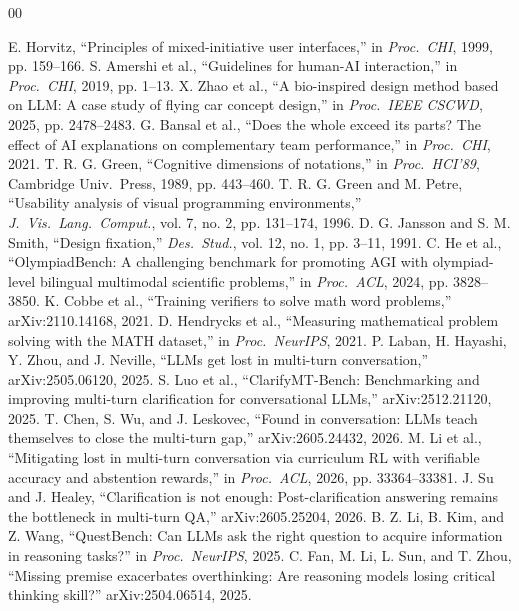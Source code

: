 \documentclass[conference,letterpaper,10pt]{IEEEtran}
\begin{document}
{\scriptsize{}\begin{thebibliography}{00}

 E. Horvitz, ``Principles of mixed-initiative user interfaces,'' in \textit{Proc.\ CHI}, 1999, pp. 159--166.
 S. Amershi et al., ``Guidelines for human-AI interaction,'' in \textit{Proc.\ CHI}, 2019, pp. 1--13.
 X. Zhao et al., ``A bio-inspired design method based on LLM: A case study of flying car concept design,'' in \textit{Proc.\ IEEE CSCWD}, 2025, pp. 2478--2483.
 G. Bansal et al., ``Does the whole exceed its parts? The effect of AI explanations on complementary team performance,'' in \textit{Proc.\ CHI}, 2021.
 T. R. G. Green, ``Cognitive dimensions of notations,'' in \textit{Proc.\ HCI'89}, Cambridge Univ.\ Press, 1989, pp. 443--460.
 T. R. G. Green and M. Petre, ``Usability analysis of visual programming environments,'' \textit{J.\ Vis.\ Lang.\ Comput.}, vol. 7, no. 2, pp. 131--174, 1996.
 D. G. Jansson and S. M. Smith, ``Design fixation,'' \textit{Des.\ Stud.}, vol. 12, no. 1, pp. 3--11, 1991.
 C. He et al., ``OlympiadBench: A challenging benchmark for promoting AGI with olympiad-level bilingual multimodal scientific problems,'' in \textit{Proc.\ ACL}, 2024, pp. 3828--3850.
 K. Cobbe et al., ``Training verifiers to solve math word problems,'' arXiv:2110.14168, 2021.
 D. Hendrycks et al., ``Measuring mathematical problem solving with the MATH dataset,'' in \textit{Proc.\ NeurIPS}, 2021.
 P. Laban, H. Hayashi, Y. Zhou, and J. Neville, ``LLMs get lost in multi-turn conversation,'' arXiv:2505.06120, 2025.
 S. Luo et al., ``ClarifyMT-Bench: Benchmarking and improving multi-turn clarification for conversational LLMs,'' arXiv:2512.21120, 2025.
 T. Chen, S. Wu, and J. Leskovec, ``Found in conversation: LLMs teach themselves to close the multi-turn gap,'' arXiv:2605.24432, 2026.
 M. Li et al., ``Mitigating lost in multi-turn conversation via curriculum RL with verifiable accuracy and abstention rewards,'' in \textit{Proc.\ ACL}, 2026, pp. 33364--33381.
 J. Su and J. Healey, ``Clarification is not enough: Post-clarification answering remains the bottleneck in multi-turn QA,'' arXiv:2605.25204, 2026.
 B. Z. Li, B. Kim, and Z. Wang, ``QuestBench: Can LLMs ask the right question to acquire information in reasoning tasks?'' in \textit{Proc.\ NeurIPS}, 2025.
 C. Fan, M. Li, L. Sun, and T. Zhou, ``Missing premise exacerbates overthinking: Are reasoning models losing critical thinking skill?'' arXiv:2504.06514, 2025.

\end{thebibliography}}
\end{document}
